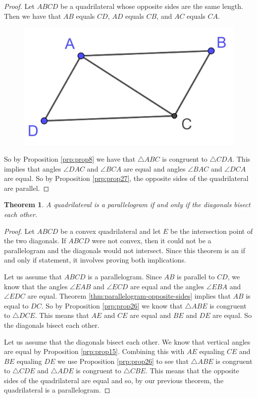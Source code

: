 \documentclass[
]{book}
\newtheorem{theorem}{Theorem}[chapter]
\theoremstyle{definition}
\theoremstyle{definition}
\theoremstyle{definition}
\theoremstyle{definition}
\theoremstyle{remark}
\begin{document}
\begin{proof}
Let \(ABCD\) be a quadrilateral whose opposite sides are the same length. Then we have that \(AB\) equals \(CD\), \(AD\) equals \(CB\), and \(AC\) equals \(CA\).

\begin{figure}

{\centering \includegraphics[width=0.2\linewidth]{images/Parallelogram1} 

}

\end{figure}

So by Proposition \ref{prp:prop8} we have that \(\triangle ABC\) is congruent to \(\triangle CDA\). This implies that angles \(\angle DAC\) and \(\angle BCA\) are equal and angles \(\angle BAC\) and \(\angle DCA\) are equal. So by Proposition \ref{prp:prop27}, the opposite sides of the quadrilateral are parallel.
\end{proof}

\begin{theorem}
A quadrilateral is a parallelogram if and only if the diagonals bisect each other.
\end{theorem}

\begin{proof}
Let \(ABCD\) be a convex quadrilateral and let \(E\) be the intersection point of the two diagonals. If \(ABCD\) were not convex, then it could not be a parallelogram and the diagonals would not intersect. Since this theorem is an if and only if statement, it involves proving both implications.

Let us assume that \(ABCD\) is a parallelogram. Since \(AB\) is parallel to \(CD\), we know that the angles \(\angle EAB\) and \(\angle ECD\) are equal and the angles \(\angle EBA\) and \(\angle EDC\) are equal. Theorem \ref{thm:parallelogram-opposite-sides} implies that \(AB\) is equal to \(DC\). So by Proposition \ref{prp:prop26} we know that \(\triangle ABE\) is congruent to \(\triangle DCE\). This means that \(AE\) and \(CE\) are equal and \(BE\) and \(DE\) are equal. So the diagonals bisect each other.

Let us assume that the diagonals bisect each other. We know that vertical angles are equal by Proposition \ref{prp:prop15}. Combining this with \(AE\) equaling \(CE\) and \(BE\) equaling \(DE\) we use Proposition \ref{prp:prop26} to see that \(\triangle ABE\) is congruent to \(\triangle CDE\) and \(\triangle ADE\) is congruent to \(\triangle CBE\). This means that the opposite sides of the quadrilateral are equal and so, by our previous theorem, the quadrilateral is a parallelogram.
\end{proof}
\end{document}
